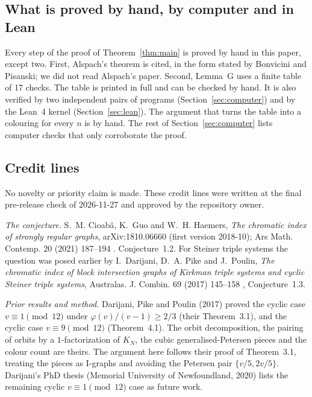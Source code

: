\documentclass[11pt]{amsart}
\theoremstyle{plain}
\theoremstyle{definition}
\theoremstyle{remark}
\numberwithin{equation}{section}
\begin{document}
\subsection{What is proved by hand, by computer and in Lean}

Every step of the proof of Theorem~\ref{thm:main} is proved by hand in this paper, except two. First, Alspach's theorem is cited, in the form stated by Bonvicini and Pisanski; we did not read Alspach's paper. Second, Lemma~G uses a finite table of 17 checks. The table is printed in full and can be checked by hand. It is also verified by two independent pairs of programs (Section~\ref{sec:computer}) and by the Lean~4 kernel (Section~\ref{sec:lean}). The argument that turns the table into a colouring for every \(n\) is by hand. The rest of Section~\ref{sec:computer} lists computer checks that only corroborate the proof.

\subsection{Credit lines}\label{sec:credits}

No novelty or priority claim is made. These credit lines were written at the final pre-release check of 2026-11-27 and approved by the repository owner.

\emph{The conjecture.} S.~M. Cioab\u{a}, K.~Guo and W.~H. Haemers, \emph{The chromatic index of strongly regular graphs}, arXiv:1810.06660 (first version 2018-10); Ars Math. Contemp. 20 (2021) 187--194 \cite{CGH}. Conjecture~1.2. For Steiner triple systems the question was posed earlier by I.~Darijani, D.~A. Pike and J.~Poulin, \emph{The chromatic index of block intersection graphs of Kirkman triple systems and cyclic Steiner triple systems}, Australas. J. Combin. 69 (2017) 145--158 \cite{DPP}, Conjecture~1.3.

\emph{Prior results and method.} Darijani, Pike and Poulin (2017) proved the cyclic case \(v\equiv 1\pmod{12}\) under \(\varphi(v)/(v-1)\ge 2/3\) (their Theorem~3.1), and the cyclic case \(v\equiv 9\pmod{12}\) (Theorem~4.1). The orbit decomposition, the pairing of orbits by a \(1\)-factorization of \(K_N\), the cubic generalised-Petersen pieces and the colour count are theirs. The argument here follows their proof of Theorem~3.1, treating the pieces as I-graphs and avoiding the Petersen pair \(\{v/5,2v/5\}\). Darijani's PhD thesis (Memorial University of Newfoundland, 2020) \cite{Dar} lists the remaining cyclic \(v\equiv 1\pmod{12}\) case as future work.
\end{document}
